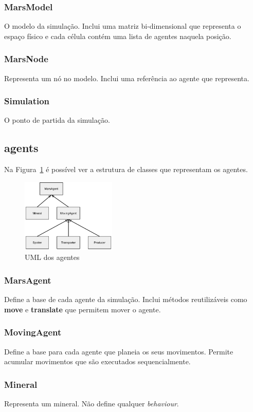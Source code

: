 \documentclass[12pt]{report}
\begin{document}
\subsubsection{MarsModel}
O modelo da simulação. Inclui uma matriz bi-dimensional que representa o espaço físico e cada célula contém uma lista de agentes naquela posição.
\subsubsection{MarsNode}
Representa um nó no modelo. Inclui uma referência ao agente que representa.
\subsubsection{Simulation}
O ponto de partida da simulação.

\newpage
\subsection{agents}

Na Figura~\ref{agents-uml} é possível ver a estrutura de classes que representam os agentes.

\begin{figure}[h]
	\centering
	\includegraphics[width=0.4\textwidth]{agents-uml}
	\caption{UML dos agentes}
	\label{agents-uml}
\end{figure}

\FloatBarrier
\subsubsection{MarsAgent}
Define a base de cada agente da simulação. Inclui métodos reutilizáveis como \textbf{move} e \textbf{translate} que permitem mover o agente.
\subsubsection{MovingAgent}
Define a base para cada agente que planeia os seus movimentos. Permite acumular movimentos que são executados sequencialmente.
\subsubsection{Mineral}
Representa um mineral. Não define qualquer \emph{behaviour}.
\end{document}
